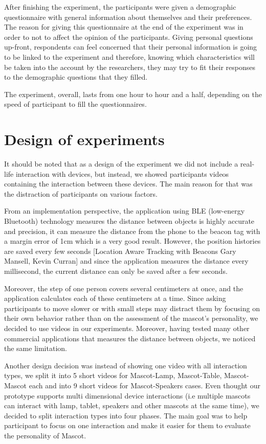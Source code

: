 After finishing the experiment, the participants were given a demographic questionnaire
with general information about themselves and their preferences.
The reason for giving this questionnaire at the end of the experiment was in order
to not to affect the opinion of the participants.
Giving personal questions up-front, respondents can feel concerned that their personal
information is going to be linked to the experiment and therefore, knowing which
characteristics will be taken into the account by the researchers, they may try
to fit their responses to the demographic questions that they filled.
\par The experiment, overall, lasts from one hour to hour and a half, depending
on the speed of participant to fill the questionnaires.

\section{Design of experiments}
\label{sec:design-of-experiments}
\par It should be noted that as a design of the experiment we did not include a
real-life interaction with devices, but instead, we showed participants videos
containing the interaction between these devices.
The main reason for that was the distraction of participants on various factors.
\par From an implementation perspective, the application using BLE (low-energy Bluetooth)
technology measures the distance between objects is highly accurate and precision,
it can measure the distance from the phone to the beacon tag with a margin error of 1cm which is a very good result.
However, the position histories are saved every few seconds [Location Aware Tracking with Beacons Gary Mansell, Kevin Curran] and
since the application measures the distance every millisecond, the current distance can only be saved after a few seconds.
\par Moreover, the step of one person covers several centimeters at once, and the
application calculates each of these centimeters at a time.
Since asking participants to move slower or with small steps may distract
them by focusing on their own behavior rather than on the assessment of the
mascot's personality, we decided to use videos in our experiments.
Moreover, having tested many other commercial applications that measures the distance between objects,
we noticed the same limitation.
\par Another design decision was instead of showing one video with all interaction types,
we split it into 5 short videos for Mascot-Lamp, Mascot-Table, Mascot-Mascot each
and into 9 short videos for Mascot-Speakers cases.
Even thought our prototype supports multi dimensional device interactions
(i.e multiple mascots can interact with lamp, tablet, speakers and other mascots at the same time),
we decided to split interaction types into four phases.
The main goal was to help participant to focus on one interaction and make
it easier for them to evaluate the personality of Mascot.

